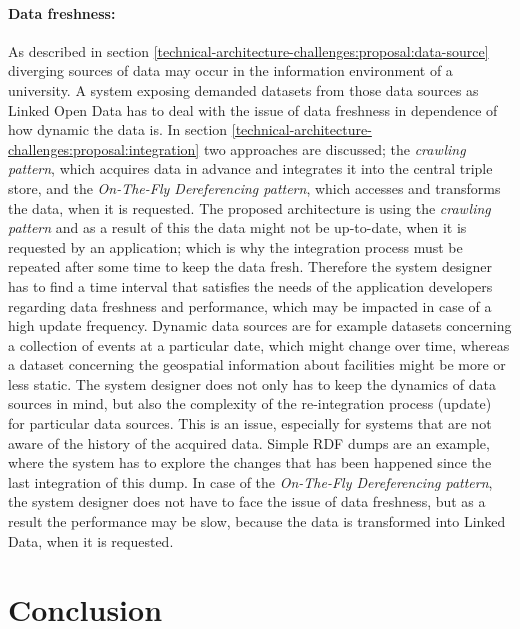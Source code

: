 \documentclass{article}
\begin{document}
\paragraph{Data freshness:} 
\label{technical-architecture-challenges:challenges:data-freshness}
As described in section \ref{technical-architecture-challenges:proposal:data-source}  diverging sources of data may occur in the information environment of a university. A system exposing demanded datasets from those data sources as Linked Open Data has to deal with the issue of data freshness in dependence of how dynamic the data is. In section \ref{technical-architecture-challenges:proposal:integration} two approaches are discussed; the \textit{crawling pattern}, which acquires data in advance and integrates it into the central triple store, and the \textit{On-The-Fly Dereferencing pattern}, which accesses and transforms the data, when it is requested. The proposed architecture is using the \textit{crawling pattern} and as a result of this the data might not be up-to-date, when it is requested by an application; which is why the integration process must be repeated after some time to keep the data fresh. Therefore the system designer has to find a time interval that satisfies the needs of the application developers regarding data freshness and performance, which may be impacted in case of a high update frequency. Dynamic data sources are for example datasets concerning a collection of events at a particular date, which might change over time, whereas a dataset concerning the geospatial information about facilities  might be more or less static. The system designer does not only has to keep the dynamics of data sources in mind, but also the complexity of the re-integration process (update) for particular data sources. This is an issue, especially for systems that are not aware of the history of the acquired data. Simple RDF dumps are an example, where the system has to explore the changes that has been happened since the last integration of this dump. In case of the \textit{On-The-Fly Dereferencing pattern}, the system designer does not have to face the issue of data freshness, but as a result the performance may be slow, because the data is transformed into Linked Data, when it is requested.


\section{Conclusion}
\label{conclusion}
\end{document}

